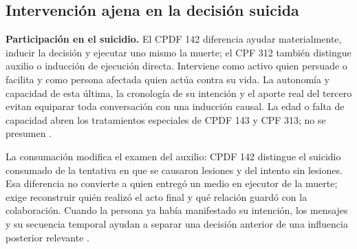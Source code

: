 \documentclass[spanish,letterpaper,oneside]{article}
\begin{document}
\subsection*{Intervención ajena en la decisión suicida}
\textbf{Participación en el suicidio.} El CPDF 142 diferencia ayudar materialmente, inducir la decisión y ejecutar uno mismo la muerte; el CPF 312 también distingue auxilio o inducción de ejecución directa. Interviene como activo quien persuade o facilita y como persona afectada quien actúa contra su vida. La autonomía y capacidad de esta última, la cronología de su intención y el aporte real del tercero evitan equiparar toda conversación con una inducción causal. La edad o falta de capacidad abren los tratamientos especiales de CPDF 143 y CPF 313; no se presumen \citep{cpdfS3Consolidado,cpfOficial2026}.

La consumación modifica el examen del auxilio: CPDF 142 distingue el suicidio consumado de la tentativa en que se causaron lesiones y del intento sin lesiones. Esa diferencia no convierte a quien entregó un medio en ejecutor de la muerte; exige reconstruir quién realizó el acto final y qué relación guardó con la colaboración. Cuando la persona ya había manifestado su intención, los mensajes y su secuencia temporal ayudan a separar una decisión anterior de una influencia posterior relevante \citep[art.~142]{cpdfS3Consolidado}.
\end{document}
